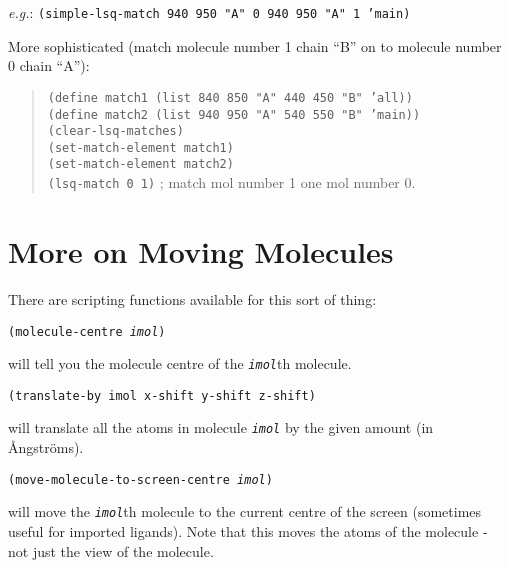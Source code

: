\documentclass{book}
\begin{document}
\emph{e.g.}: 
\texttt{(simple-lsq-match 940 950 "A" 0 940 950 "A" 1 'main)}

More sophisticated (match molecule number 1 chain ``B'' on to molecule
number 0 chain ``A''):

\vspace{-2mm}
\begin{quote}
\texttt{(define match1 (list 840 850 "A" 440 450 "B" 'all))}\\
\texttt{(define match2 (list 940 950 "A" 540 550 "B" 'main))}\\
\texttt{(clear-lsq-matches)}\\
\texttt{(set-match-element match1)}\\
\texttt{(set-match-element match2)}\\
\texttt{(lsq-match 0 1)} ; match mol number 1 one mol number 0.
\end{quote}


\section{More on Moving Molecules}
There are scripting functions available for this sort of thing:

\texttt{(molecule-centre \emph{imol})} 

will tell you the molecule centre  of the
\texttt{\emph{imol}}th molecule.

\texttt{(translate-by \texttt{imol x-shift y-shift z-shift})}

will translate all the atoms in molecule \texttt{\emph{imol}} by the
given amount (in {\AA}ngstr\"{o}ms).

\texttt{(move-molecule-to-screen-centre \emph{imol})}

will move the \texttt{\emph{imol}}th molecule to the current centre of
the screen (sometimes useful for imported ligands).  Note that this
moves the atoms of the molecule - not just the view of the molecule.
\end{document}
